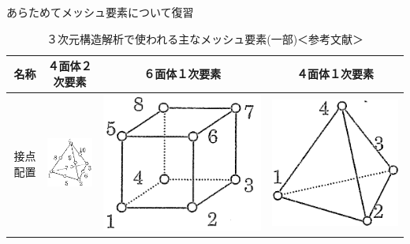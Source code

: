 \begin{frame}{あらためてメッシュ要素について復習}
  \begin{table}[hbtp]
    \caption{３次元構造解析で使われる主なメッシュ要素(一部)＜参考文献\cite{handbook}＞}
    \vspace{-5mm}
    \begin{NiceTabular}{|r|c|c|c|} %
       \hline
       名称       & ４面体２次要素 & ６面体１次要素 & ４面体１次要素 \\
       \midrule
       接点配置 &  \includegraphics[keepaspectratio,height=35mm]{images/tet10.png}
                & \includegraphics[keepaspectratio]{images/hex8.png} 
                & \includegraphics[keepaspectratio]{images/tet4.png}  \\

\end{NiceTabular}
\end{table}
\end{frame}
